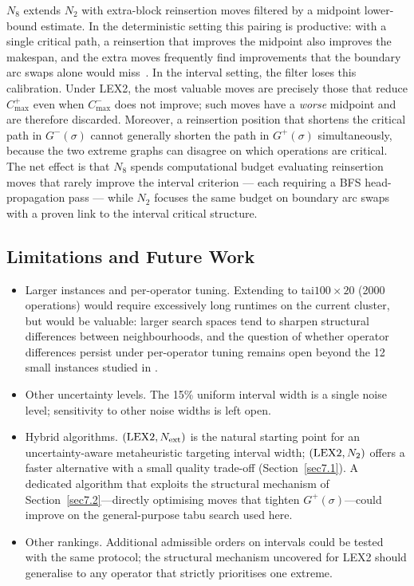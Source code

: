 \documentclass[preprint,12pt]{elsarticle}
\begin{document}
$N_8$ extends $N_2$ with extra-block reinsertion moves filtered by a midpoint lower-bound estimate. In the deterministic setting this pairing is productive: with a single critical path, a reinsertion that improves the midpoint also improves the makespan, and the extra moves frequently find improvements that the boundary arc swaps alone would miss~\cite{Xie2022}. In the interval setting, the filter loses this calibration. Under LEX2, the most valuable moves are precisely those that reduce $C^+_{\max}$ even when $C^-_{\max}$ does not improve; such moves have a \emph{worse} midpoint and are therefore discarded. Moreover, a reinsertion position that shortens the critical path in $G^-(\sigma)$ cannot generally shorten the path in $G^+(\sigma)$ simultaneously, because the two extreme graphs can disagree on which operations are critical. The net effect is that $N_8$ spends computational budget evaluating reinsertion moves that rarely improve the interval criterion --- each requiring a BFS head-propagation pass --- while $N_2$ focuses the same budget on boundary arc swaps with a proven link to the interval critical structure.

\subsection{Limitations and Future Work}
\label{sec7.5}

\begin{itemize}
\item Larger instances and per-operator tuning. Extending to tai$100{\times}20$ (2000 operations) would require excessively long runtimes on the current cluster, but would be valuable: larger search spaces tend to sharpen structural differences between neighbourhoods, and the question of whether operator differences persist under per-operator tuning remains open beyond the 12 small instances studied in \cite{DiazICAE2023,DiazIGPL2022}.
\item Other uncertainty levels. The 15\% uniform interval width is a single noise level; sensitivity to other noise widths is left open.
\item Hybrid algorithms. $({\rm LEX2}, N_{\rm ext})$ is the natural starting point for an uncertainty-aware metaheuristic targeting interval width; $({\rm LEX2}, N_2)$ offers a faster alternative with a small quality trade-off (Section~\ref{sec7.1}). A dedicated algorithm that exploits the structural mechanism of Section~\ref{sec7.2}---directly optimising moves that tighten $G^+(\sigma)$---could improve on the general-purpose tabu search used here.
\item Other rankings. Additional admissible orders on intervals \cite{Bustince2013} could be tested with the same protocol; the structural mechanism uncovered for LEX2 should generalise to any operator that strictly prioritises one extreme.
\end{itemize}
\end{document}
